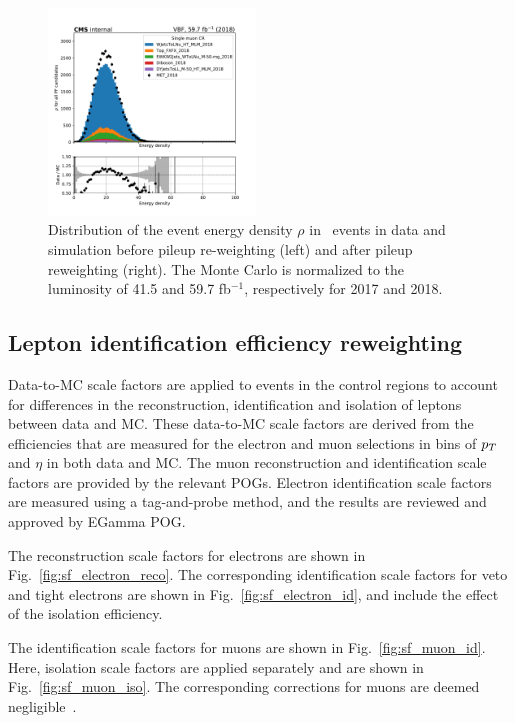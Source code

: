 \begin{figure}[ht!]
\begin{center}
    \includegraphics[width=0.49\textwidth]{Pileup/cr_1m_vbf_rho_all_2018.pdf}
    \caption{
        Distribution of the event energy density $\rho$ in \Wmn~events in data and
        simulation before pileup re-weighting (left) and after pileup reweighting (right).
        The Monte Carlo is normalized to the luminosity of 41.5 and 59.7 fb$^{-1}$, respectively for 2017 and 2018.
    }
    \label{fig:purwt_rho}
  \end{center}
\end{figure}

\clearpage

\subsection{Lepton identification efficiency reweighting}
\label{subsec:lepton_id_reweighting}

Data-to-MC scale factors are applied to events in the control regions to
account for differences in the reconstruction, identification and isolation of leptons
between data and MC. These data-to-MC scale factors are derived from the efficiencies that are measured for the electron and muon
selections in bins of $p_T$ and $\eta$ in both data and MC. The muon reconstruction and identification scale factors are
provided by the relevant POGs. Electron identification scale factors are measured using a tag-and-probe method, and the results are reviewed 
and approved by EGamma POG.

The reconstruction scale factors for electrons are shown in Fig.~\ref{fig:sf_electron_reco}. The corresponding identification scale factors for 
veto and tight electrons are shown in Fig.~\ref{fig:sf_electron_id}, and include the effect of the isolation efficiency. 

The identification scale factors for muons are shown in Fig.~\ref{fig:sf_muon_id}. Here, isolation scale factors are applied separately and are 
shown in Fig.~\ref{fig:sf_muon_iso}. The corresponding corrections for muons are deemed negligible~\cite{CMS-MUO-TWIKI-SF}.

